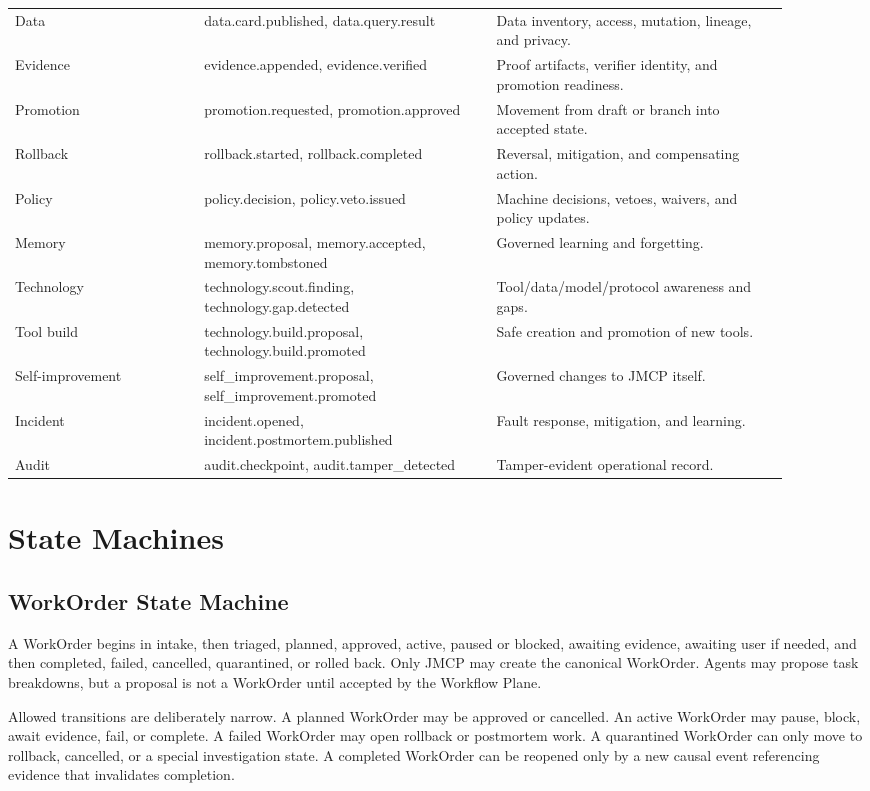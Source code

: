 \documentclass[10pt,journal,onecolumn]{IEEEtran}
\begin{document}
\begin{longtable}{@{}p{0.22\linewidth}p{0.34\linewidth}p{0.34\linewidth}@{}}
Data & data.card.published, data.query.result & Data inventory, access, mutation, lineage, and privacy. \\
Evidence & evidence.appended, evidence.verified & Proof artifacts, verifier identity, and promotion readiness. \\
Promotion & promotion.requested, promotion.approved & Movement from draft or branch into accepted state. \\
Rollback & rollback.started, rollback.completed & Reversal, mitigation, and compensating action. \\
Policy & policy.decision, policy.veto.issued & Machine decisions, vetoes, waivers, and policy updates. \\
Memory & memory.proposal, memory.accepted, memory.tombstoned & Governed learning and forgetting. \\
Technology & technology.scout.finding, technology.gap.detected & Tool/data/model/protocol awareness and gaps. \\
Tool build & technology.build.proposal, technology.build.promoted & Safe creation and promotion of new tools. \\
Self-improvement & self\_improvement.proposal, self\_improvement.promoted & Governed changes to JMCP itself. \\
Incident & incident.opened, incident.postmortem.published & Fault response, mitigation, and learning. \\
Audit & audit.checkpoint, audit.tamper\_detected & Tamper-evident operational record. \\
\bottomrule
\end{longtable}

\section{State Machines}
\subsection{WorkOrder State Machine}
A WorkOrder begins in intake, then triaged, planned, approved, active, paused or blocked, awaiting evidence, awaiting user if needed, and then completed, failed, cancelled, quarantined, or rolled back. Only JMCP may create the canonical WorkOrder. Agents may propose task breakdowns, but a proposal is not a WorkOrder until accepted by the Workflow Plane.

Allowed transitions are deliberately narrow. A planned WorkOrder may be approved or cancelled. An active WorkOrder may pause, block, await evidence, fail, or complete. A failed WorkOrder may open rollback or postmortem work. A quarantined WorkOrder can only move to rollback, cancelled, or a special investigation state. A completed WorkOrder can be reopened only by a new causal event referencing evidence that invalidates completion.
\end{document}
